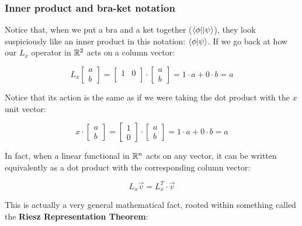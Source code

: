 \subsubsection{Inner product and bra-ket notation}

Notice that, when we put a bra and a ket together ($\langle\phi||\psi\rangle$), they look suspiciously like an inner product in this notation: $\langle\phi|\psi\rangle$. If we go back at how our $L_x$ operator in $\mathbb{R}^2$ acts on a column vector:

\begin{equation}
    L_x\begin{bmatrix}
        a \\ b
    \end{bmatrix} =
    \begin{bmatrix}
        1 & 0 \\
    \end{bmatrix}\cdot
    \begin{bmatrix}
        a \\ b
    \end{bmatrix} = 1 \cdot a + 0\cdot b = a
\end{equation}

Notice that its action is the same as if we were taking the dot product with the $x$ unit vector:

\begin{equation}
    x\cdot\begin{bmatrix}
        a \\ b
    \end{bmatrix} = 
    \begin{bmatrix}
        1 \\ 0
    \end{bmatrix}\cdot
    \begin{bmatrix}
        a \\ b
    \end{bmatrix} = 1 \cdot a + 0\cdot b = a
\end{equation}

In fact, when a linear functional in $\mathbb{R}^n$ acts on any vector, it can be written equivalently as a dot product with the corresponding column vector:

\begin{equation}
    L_x \vec{v} = L_x^T\cdot \vec{v}
\end{equation}

This is actually a very general mathematical fact, rooted within something called the \textbf{Riesz Representation Theorem}:

